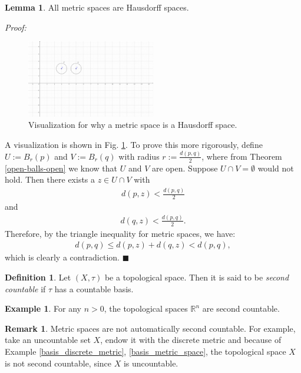 \documentclass[12pt, a4paper]{article}
\numberwithin{equation}{section}
\theoremstyle{definition}
\theoremstyle{definition}
\newtheorem{defn}[thm]{Definition} %
\newtheorem{exmp}[thm]{Example} %
\newtheorem{lemma}[thm]{Lemma} %
\newtheorem{remark}[thm]{Remark} %
\begin{document}
	\begin{lemma}
		All metric spaces are Hausdorff spaces. 
	\end{lemma}
	\noindent\textit{Proof:} 
	\begin{figure}[h!]		
		\centering 
		\includegraphics[trim = {3.8cm 5.8cm 9.7cm 2.8cm}, width=0.5\textwidth, clip]{Figures/metric-spaces-Hausdorff-spaces-v2.png}
		\caption{Visualization for why a metric space is a Hausdorff space.}
		\label{metric-space-Hausdorff-space}
	\end{figure} 
	A visualization is shown in Fig. \ref{metric-space-Hausdorff-space}. To prove this more rigorously, define $U := B_{r}(p)$ and $V:=B_{r}(q)$ with radius $r := \frac{d(p, q)}{2}$, where from Theorem \ref{open-balls-open} we know that $U$ and $V$ are open. Suppose $U\cap V = \emptyset$ would not hold. Then there exists a $z\in U\cap V$ with 
	\begin{align}
		d(p, z) < \frac{d(p, q)}{2}
	\end{align}
	and 
	\begin{align}
		d(q, z) < \frac{d(p, q)}{2}. 
	\end{align}
	Therefore, by the triangle inequality for metric spaces, we have: 
	\begin{align}
		d(p, q) \leq d(p, z) + d(q, z) < d(p, q), 
	\end{align}
	which is clearly a contradiction. 
	\qquad\qquad\qquad\qquad\qquad\qquad\qquad\qquad\qquad\qquad\qquad\qquad\qquad\qquad\quad$\blacksquare$
	
	\begin{defn}
		Let $(X, \tau)$ be a topological space. Then it is said to be \textit{second countable} if $\tau$ has a countable basis. 
	\end{defn}
	
	\begin{exmp}
		For any $n > 0$, the topological spaces $\mathbb R^n$ are second countable. 
	\end{exmp}
	
	\begin{remark}
		Metric spaces are not automatically second countable. For example, take an uncountable set $X$, endow it with the discrete metric and because of Example \ref{basis_discrete_metric}, \ref{basis_metric_space},  the topological space $X$ is not second countable, since $X$ is uncountable. 
	\end{remark}
	
\end{document}
